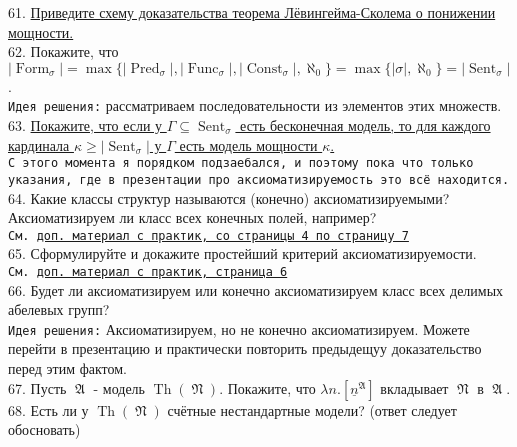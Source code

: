 \documentclass[a4paper,100pt]{article}
\theoremstyle{indented}
\theoremstyle{definition}
\theoremstyle{remark}
\DeclareMathOperator{\form}{Form}
\DeclareMathOperator{\Pred}{Pred}
\DeclareMathOperator{\Func}{Func}
\DeclareMathOperator{\Const}{Const}
\DeclareMathOperator{\Sent}{Sent}
\DeclareMathOperator{\Th}{Th}
\DeclareMathOperator{\GA}{\mathfrak{A}}
\DeclareMathOperator{\GN}{\mathfrak{N}}
\begin{document}
61. \hyperlink{b61}{Приведите схему доказательства теорема Лёвингейма-Сколема о понижении мощности.} \\

62. %
{Покажите, что $|\form_\sigma|=\max \{|\Pred_\sigma|, |\Func_\sigma|, |\Const_\sigma|, \aleph_0\} = \max\{|\sigma|, \aleph_0\}=|\Sent_\sigma|$.} \\

\texttt{Идея решения:} рассматриваем последовательности из элементов этих множеств. \\ 

63. \hyperlink{b63}{Покажите, что если у $\Gamma \subseteq \Sent_\sigma$ есть бесконечная модель, то для каждого кардинала $\kappa \geq |\Sent_\sigma|$ у $\Gamma$ есть модель мощности $\kappa$.} \\

\texttt{С этого момента я порядком подзаебался, и поэтому пока что только указания, где в презентации про аксиоматизируемость это всё находится.} \\

64. Какие классы структур называются (конечно) аксиоматизируемыми? Аксиоматизируем ли класс всех конечных полей, например? \\ 

\texttt{См. \href{http://www.mi-ras.ru/~speranski/courses/logic-1-2021-spring/slides-axiomatisability.pdf}{доп. материал с практик, со страницы 4 по страницу 7}} \\

65. Сформулируйте и докажите простейший критерий аксиоматизируемости. \\ 

\texttt{См. \href{http://www.mi-ras.ru/~speranski/courses/logic-1-2021-spring/slides-axiomatisability.pdf}{доп. материал с практик, страница 6}} \\

66. Будет ли аксиоматизируем или конечно аксиоматизируем класс всех делимых абелевых групп? \\ 

\texttt{Идея решения:} Аксиоматизируем, но не конечно аксиоматизируем. Можете перейти в презентацию и практически повторить предыдещуу доказательство перед этим фактом. \\ 

67. Пусть $\GA$ - модель $\Th(\GN)$. Покажите, что $\lambda n.[\underline{n}^{\GA}]$ вкладывает $\GN$ в $\GA$. \\ 

68. Есть ли у $\Th(\GN)$ счётные нестандартные модели? (ответ следует обосновать) \\ 
\end{document}
